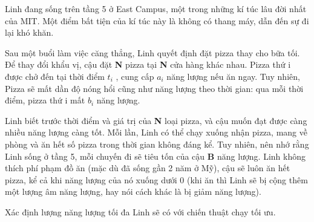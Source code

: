 Linh đang sống trên tầng 5 ở East Campus, một trong những kí túc lâu đời nhất của MIT. Một điểm bất tiện của kí túc này là không có thang máy, dẫn đến sự đi lại khó khăn.   



   Sau một buổi làm việc căng thẳng, Linh quyết định đặt pizza thay cho bữa tối. Để thay đổi khẩu vị, cậu đặt   \textbf{    N   }   pizza tại   \textbf{    N   }   cửa hàng khác nhau. Pizza thứ i được chở đến tại thời điểm   \textbf{    $t_{i}$}   , cung cấp   \textbf{    $a_{i}$}   năng lượng nếu ăn ngay. Tuy nhiên, Pizza sẽ mất dần độ nóng hổi cũng như năng lượng theo thời gian: qua mỗi thời điểm, pizza thứ i mất   \textbf{    $b_{i}$}   năng lượng.  

     Linh biết trước thời điểm và giá trị của     \textbf{      N     }     loại pizza, và cậu muốn đạt được càng nhiều năng lượng càng tốt. Mỗi lần, Linh có thể chạy xuống nhận pizza, mang về phòng và ăn hết số pizza trong thời gian không đáng kể. Tuy nhiên, nên nhớ rằng Linh sống ở tầng 5, mỗi chuyến đi sẽ tiêu tốn của cậu     \textbf{      B     }     năng lượng. Linh không thích phí phạm đồ ăn (mặc dù đã sống gần 2 năm ở Mỹ), cậu sẽ luôn ăn hết pizza, kể cả khi năng lượng của nó xuống dưới 0 (khi ăn thì Linh sẽ bị cộng thêm một lượng âm năng lượng, hay nói cách khác là bị giảm năng lượng).    

      Xác định lượng năng lượng tối đa Linh sẽ có với chiến thuật chạy tối ưu.
